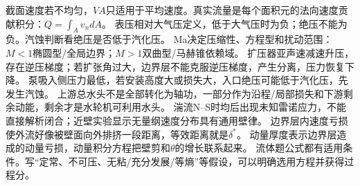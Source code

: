 截面速度若不均匀，$VA$只适用于平均速度。真实流量是每个面积元的法向速度贡献积分：$Q=\int_A v_n dA$。
表压相对大气压定义，低于大气压时为负；绝压不能为负。汽蚀判断看绝压是否低于汽化压。
Ma决定压缩性、方程型和扰动范围：$M<1$椭圆型/全局边界；$M>1$双曲型/马赫锥依赖域。
扩压器亚声速减速升压，存在逆压梯度；若扩张角过大，边界层不能克服逆压梯度，产生分离，压力恢复下降。
泵吸入侧压力最低，若安装高度大或损失大，入口绝压可能低于汽化压，先发生汽蚀。
上游总水头不是全部转化为轴功，一部分作为沿程/局部损失和下游剩余动能，剩余才是水轮机可利用水头。
湍流N--S时均后出现未知雷诺应力，不能直接解析闭合；近壁实验显示无量纲速度分布具有通用壁律。
边界层内速度亏损使外流好像被壁面向外排挤一段距离，等效距离就是$\delta^*$。
动量厚度表示边界层造成的动量亏损，动量积分方程把壁剪和$\theta$的增长联系起来。
流体题公式都有适用条件。写“定常、不可压、无粘/充分发展/等熵”等假设，可以明确选用方程并获得过程分。

